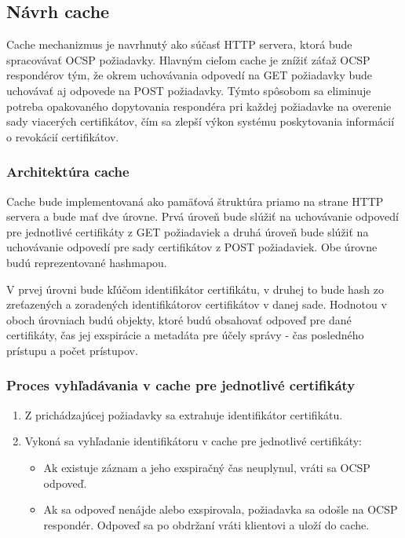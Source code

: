 \documentclass[12pt, twoside]{book}
\begin{document}
\subsection{Návrh cache}
Cache mechanizmus je navrhnutý ako súčasť HTTP servera, ktorá bude spracovávať OCSP požiadavky. Hlavným cieľom cache je znížiť záťaž OCSP respondérov tým, že okrem uchovávania odpovedí na GET požiadavky bude uchovávať aj odpovede na POST požiadavky. Týmto spôsobom sa eliminuje potreba opakovaného dopytovania respondéra pri každej požiadavke na overenie sady viacerých certifikátov, čím sa zlepší výkon systému poskytovania informácií o revokácií certifikátov.

\subsubsection{Architektúra cache}
Cache bude implementovaná ako pamäťová štruktúra priamo na strane HTTP servera a bude mať dve úrovne. Prvá úroveň bude slúžiť na uchovávanie odpovedí pre jednotlivé certifikáty z GET požiadaviek a druhá úroveň bude slúžiť na uchovávanie odpovedí pre sady certifikátov z POST požiadaviek. Obe úrovne budú reprezentované hashmapou.

V prvej úrovni bude kľúčom identifikátor certifikátu, v druhej to bude hash zo zreťazených a zoradených identifikátorov certifikátov v danej sade. Hodnotou v oboch úrovniach budú objekty, ktoré budú obsahovať odpoveď pre dané certifikáty, čas jej exspirácie a metadáta pre účely správy - čas posledného prístupu a počet prístupov.

\subsubsection{Proces vyhľadávania v cache pre jednotlivé certifikáty}
\begin{enumerate}
\item Z prichádzajúcej požiadavky sa extrahuje identifikátor certifikátu.
\item Vykoná sa vyhľadanie identifikátoru v cache pre jednotlivé certifikáty:
    \begin{itemize}
    \item Ak existuje záznam a jeho exspiračný čas neuplynul, vráti sa OCSP odpoveď.
    \item Ak sa odpoveď nenájde alebo exspirovala, požiadavka sa odošle na OCSP respondér. Odpoveď sa po obdržaní vráti klientovi a uloží do cache.
    \end{itemize}
\end{enumerate}
\end{document}
